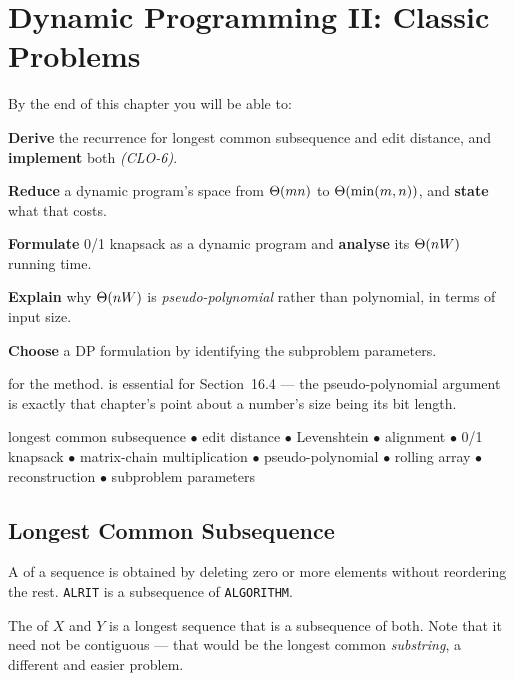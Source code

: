 \chapter{Dynamic Programming II: Classic Problems}\label{ch:dptwo}

\begin{outcomes}
By the end of this chapter you will be able to:
\begin{tight}
  \item \textbf{Derive} the recurrence for longest common subsequence and edit
        distance, and \textbf{implement} both \emph{(CLO-6)}.
  \item \textbf{Reduce} a dynamic program's space from $\Theta(mn)$ to
        $\Theta(\min(m,n))$, and \textbf{state} what that costs.
  \item \textbf{Formulate} 0/1 knapsack as a dynamic program and
        \textbf{analyse} its $\Theta(nW)$ running time.
  \item \textbf{Explain} why $\Theta(nW)$ is \emph{pseudo-polynomial} rather
        than polynomial, in terms of input size.
  \item \textbf{Choose} a DP formulation by identifying the subproblem
        parameters.
\end{tight}
\end{outcomes}

\begin{prereq}
 for the method.  is essential for Section~16.4 ---
the pseudo-polynomial argument is exactly that chapter's point about a number's
size being its bit length.
\end{prereq}

\begin{keyterms}
longest common subsequence $\bullet$ edit distance $\bullet$ Levenshtein
$\bullet$ alignment $\bullet$ 0/1 knapsack $\bullet$ matrix-chain
multiplication $\bullet$ pseudo-polynomial $\bullet$ rolling array $\bullet$
reconstruction $\bullet$ subproblem parameters
\end{keyterms}

\section{Longest Common Subsequence}

\begin{definitionbox}
A  of a sequence is obtained by deleting zero or more
elements without reordering the rest. \texttt{ALRIT} is a subsequence of
\texttt{ALGORITHM}.

\smallskip
The  of $X$ and $Y$ is a longest sequence that
is a subsequence of both. Note that it need not be contiguous --- that would be
the longest common \emph{substring}, a different and easier problem.
\end{definitionbox}

